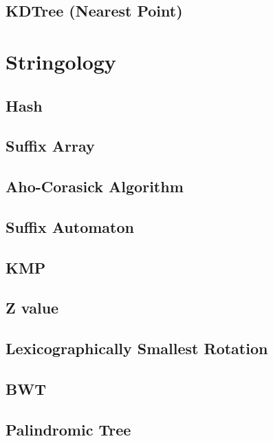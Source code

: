 \documentclass[a4paper,10pt,twocolumn,oneside]{article}
\begin{document}
\subsection{KDTree (Nearest Point)}


\section{Stringology}
\subsection{Hash}

\subsection{Suffix Array}

\subsection{Aho-Corasick Algorithm}

\subsection{Suffix Automaton}

\subsection{KMP}

\subsection{Z value}

\subsection{Lexicographically Smallest Rotation}

\subsection{BWT}

\subsection{Palindromic Tree}

\end{document}
